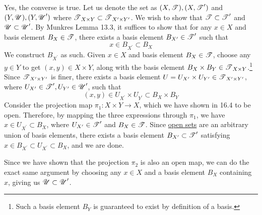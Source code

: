   \begin{solution}[Munkres 16.5.b]
    Yes, the converse is true. Let us denote the set as $(X,\operatorname{\mathscr{T}}), (X, \operatorname{\mathscr{T}}^\prime)$ and $(Y, \operatorname{\mathscr{U}}), (Y, \operatorname{\mathscr{U}}^\prime)$ where $\operatorname{\mathscr{T}}_{X \times Y} \subset \operatorname{\mathscr{T}}_{X^\prime \times Y^\prime}$. We wish to show that $\operatorname{\mathscr{T}} \subset \operatorname{\mathscr{T}}^\prime$ and $\operatorname{\mathscr{U}} \subset \operatorname{\mathscr{U}}^\prime$. By Munkres Lemma 13.3, it suffices to show that for any $x \in X$ and basis element $B_X \in \operatorname{\mathscr{T}}$, there exists a basis element $B_{X^\prime} \in \operatorname{\mathscr{T}}^\prime$ such that 
    \begin{equation}
      x \in B_{X^\prime} \subset B_X
    \end{equation} 
    We construct $B_{X^\prime}$ as such. Given $x \in X$ and basis element $B_X \in \operatorname{\mathscr{T}}$, choose any $y \in Y$ to get $(x, y) \in X \times Y$, along with the basis element $B_X \times B_Y \in \operatorname{\mathscr{T}}_{X \times Y}$.\footnote{Such a basis element $B_Y$ is guaranteed to exist by definition of a basis.} Since $\operatorname{\mathscr{T}}_{X^\prime \times Y^\prime}$ is finer, there exists a basis element $U = U_{X^\prime} \times U_{Y^\prime} \in \operatorname{\mathscr{T}}_{X^\prime \times Y^\prime}$, where $U_{X^\prime} \in \operatorname{\mathscr{T}}^\prime, U_{Y^\prime} \in \operatorname{\mathscr{U}}^\prime$, such that 
    \begin{equation}
      (x, y) \in U_{X^\prime} \times U_{Y^\prime} \subset B_X \times B_Y
    \end{equation} 
    Consider the projection map $\pi_1: X \times Y \rightarrow X$, which we have shown in 16.4 to be open. Therefore, by mapping the three expressions through $\pi_1$, we have $x \in U_{X^\prime} \subset B_X$, where $U_{X^\prime} \in \operatorname{\mathscr{T}}^\prime$ and $B_X \in \operatorname{\mathscr{T}}$. Since \hyperref[def:open-set]{open sets} are an arbitrary union of basis elements, there exists a basis element $B_{X^\prime} \subset \operatorname{\mathscr{T}}^\prime$ satisfying $x \in B_{X^\prime} \subset U_{X^\prime} \subset B_{X}$, and we are done. 

    Since we have shown that the projection $\pi_2$ is also an open map, we can do the exact same argument by choosing any $x \in X$ and a basis element $B_X$ containing $x$, giving us $\operatorname{\mathscr{U}} \subset \operatorname{\mathscr{U}}^\prime$. 
  \end{solution}

